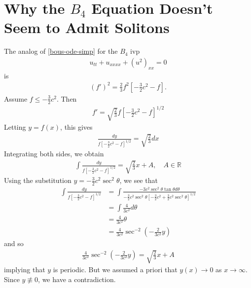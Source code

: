 \documentclass[12pt,reqno]{amsart}
\numberwithin{equation}{section}  %
\newcommand{\rr}{\mathbb{R}}
\begin{document}
\section{Why the $B_{4}$ Equation Doesn't Seem to Admit Solitons} 
\label{sec:B4-soliton-fail}
%
%
The analog of \eqref{bous-ode-simp} for the $B_{4}$ ivp
\begin{equation}
  \label{b4}
\begin{split}
  u_{tt} + u_{xxxx} + (u^{2})_{xx} = 0
\end{split}
\end{equation}
is
\begin{equation}
  \label{b4-ode-simp}
\begin{split}
  (f')^{2} = \frac{2}{3} f^{2} \left [ -\frac{3}{2}c^{2} -f \right ]. 
\end{split}
\end{equation}
Assume $f \le -\frac{3}{2}c^{2}$. Then 
%
\begin{equation*}
\begin{split}
  f' = \sqrt{\frac{2}{3}}f \left[ -\frac{3}{2}c^{2} -f \right]^{1/2}
\end{split}
\end{equation*}
%
%
Letting $y = f(x)$, this gives
%
%
\begin{equation*}
\begin{split}
\frac{dy}{ f \left[ -\frac{3}{2}c^{2} -f \right]^{1/2}} = \sqrt{\frac{2}{3}}
dx
\end{split}
\end{equation*}
%
Integrating both sides, we obtain
%
%
%
%
\begin{equation*}
\begin{split}
\int \frac{dy}{ f \left[ -\frac{3}{2}c^{2} -f \right]^{1/2}} = \sqrt{\frac{2}{3}}
x + A, \quad A \in \rr
\end{split}
\end{equation*}
%
%
Using the substitution $y = -\frac{3}{2}c^{2}\sec^{2} \theta$, we see that
%
%
\begin{equation*}
\begin{split}
\int \frac{dy}{ f \left[ -\frac{3}{2}c^{2} -f \right]^{1/2}} 
& = \int \frac{-3 c^{2} \sec^{2}\theta \tan \theta d
\theta}{-\frac{3}{2}c^{2} \sec^{2} \theta \left[ -\frac{3}{2}c^{2} +
\frac{3}{2}c^{2} \sec^{2} \theta \right]^{1/2}}
\\
& = \int \frac{4}{3c^{2}} d \theta
\\
& = \frac{4}{3c^{2}} \theta
\\
& = \frac{4}{3c^{2}} \sec^{-2}\left (-\frac{2}{3c^{2}}y \right )
\end{split}
\end{equation*}
%
%
and so
%
%
\begin{equation*}
\begin{split}
 \frac{4}{3c^{2}} \sec^{-2}\left (-\frac{2}{3c^{2}}y \right )
= \sqrt{\frac{2}{3}}
x + A
\end{split}
\end{equation*}
%
%
implying that $y$ is periodic. But we assumed a priori that $y(x) \to 0$ as $x
\to \infty$. Since $y \not \equiv 0$, we have a contradiction.
\end{document}

